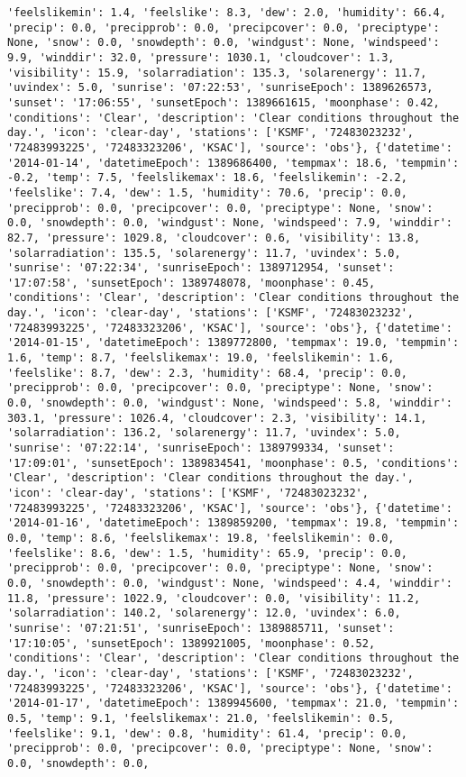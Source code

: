 \documentclass[
  letterpaper,
  DIV=11,
  numbers=noendperiod]{scrartcl}
\begin{document}
\begin{verbatim}
'feelslikemin': 1.4, 'feelslike': 8.3, 'dew': 2.0, 'humidity': 66.4, 'precip': 0.0, 'precipprob': 0.0, 'precipcover': 0.0, 'preciptype': None, 'snow': 0.0, 'snowdepth': 0.0, 'windgust': None, 'windspeed': 9.9, 'winddir': 32.0, 'pressure': 1030.1, 'cloudcover': 1.3, 'visibility': 15.9, 'solarradiation': 135.3, 'solarenergy': 11.7, 'uvindex': 5.0, 'sunrise': '07:22:53', 'sunriseEpoch': 1389626573, 'sunset': '17:06:55', 'sunsetEpoch': 1389661615, 'moonphase': 0.42, 'conditions': 'Clear', 'description': 'Clear conditions throughout the day.', 'icon': 'clear-day', 'stations': ['KSMF', '72483023232', '72483993225', '72483323206', 'KSAC'], 'source': 'obs'}, {'datetime': '2014-01-14', 'datetimeEpoch': 1389686400, 'tempmax': 18.6, 'tempmin': -0.2, 'temp': 7.5, 'feelslikemax': 18.6, 'feelslikemin': -2.2, 'feelslike': 7.4, 'dew': 1.5, 'humidity': 70.6, 'precip': 0.0, 'precipprob': 0.0, 'precipcover': 0.0, 'preciptype': None, 'snow': 0.0, 'snowdepth': 0.0, 'windgust': None, 'windspeed': 7.9, 'winddir': 82.7, 'pressure': 1029.8, 'cloudcover': 0.6, 'visibility': 13.8, 'solarradiation': 135.5, 'solarenergy': 11.7, 'uvindex': 5.0, 'sunrise': '07:22:34', 'sunriseEpoch': 1389712954, 'sunset': '17:07:58', 'sunsetEpoch': 1389748078, 'moonphase': 0.45, 'conditions': 'Clear', 'description': 'Clear conditions throughout the day.', 'icon': 'clear-day', 'stations': ['KSMF', '72483023232', '72483993225', '72483323206', 'KSAC'], 'source': 'obs'}, {'datetime': '2014-01-15', 'datetimeEpoch': 1389772800, 'tempmax': 19.0, 'tempmin': 1.6, 'temp': 8.7, 'feelslikemax': 19.0, 'feelslikemin': 1.6, 'feelslike': 8.7, 'dew': 2.3, 'humidity': 68.4, 'precip': 0.0, 'precipprob': 0.0, 'precipcover': 0.0, 'preciptype': None, 'snow': 0.0, 'snowdepth': 0.0, 'windgust': None, 'windspeed': 5.8, 'winddir': 303.1, 'pressure': 1026.4, 'cloudcover': 2.3, 'visibility': 14.1, 'solarradiation': 136.2, 'solarenergy': 11.7, 'uvindex': 5.0, 'sunrise': '07:22:14', 'sunriseEpoch': 1389799334, 'sunset': '17:09:01', 'sunsetEpoch': 1389834541, 'moonphase': 0.5, 'conditions': 'Clear', 'description': 'Clear conditions throughout the day.', 'icon': 'clear-day', 'stations': ['KSMF', '72483023232', '72483993225', '72483323206', 'KSAC'], 'source': 'obs'}, {'datetime': '2014-01-16', 'datetimeEpoch': 1389859200, 'tempmax': 19.8, 'tempmin': 0.0, 'temp': 8.6, 'feelslikemax': 19.8, 'feelslikemin': 0.0, 'feelslike': 8.6, 'dew': 1.5, 'humidity': 65.9, 'precip': 0.0, 'precipprob': 0.0, 'precipcover': 0.0, 'preciptype': None, 'snow': 0.0, 'snowdepth': 0.0, 'windgust': None, 'windspeed': 4.4, 'winddir': 11.8, 'pressure': 1022.9, 'cloudcover': 0.0, 'visibility': 11.2, 'solarradiation': 140.2, 'solarenergy': 12.0, 'uvindex': 6.0, 'sunrise': '07:21:51', 'sunriseEpoch': 1389885711, 'sunset': '17:10:05', 'sunsetEpoch': 1389921005, 'moonphase': 0.52, 'conditions': 'Clear', 'description': 'Clear conditions throughout the day.', 'icon': 'clear-day', 'stations': ['KSMF', '72483023232', '72483993225', '72483323206', 'KSAC'], 'source': 'obs'}, {'datetime': '2014-01-17', 'datetimeEpoch': 1389945600, 'tempmax': 21.0, 'tempmin': 0.5, 'temp': 9.1, 'feelslikemax': 21.0, 'feelslikemin': 0.5, 'feelslike': 9.1, 'dew': 0.8, 'humidity': 61.4, 'precip': 0.0, 'precipprob': 0.0, 'precipcover': 0.0, 'preciptype': None, 'snow': 0.0, 'snowdepth': 0.0, 
\end{verbatim}
\end{document}
